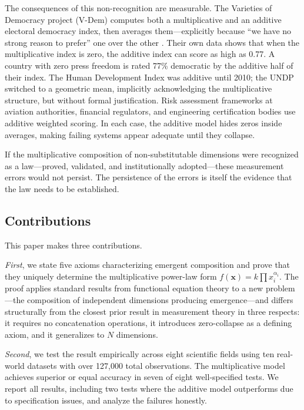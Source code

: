 \documentclass[12pt, a4paper]{article}
\theoremstyle{definition}
\theoremstyle{remark}
\begin{document}
The consequences of this non-recognition are measurable. The Varieties of Democracy project (V-Dem) computes both a multiplicative and an additive electoral democracy index, then averages them---explicitly because ``we have no strong reason to prefer'' one over the other \cite{coppedge2018}. Their own data shows that when the multiplicative index is zero, the additive index can score as high as 0.77. A country with zero press freedom is rated 77\% democratic by the additive half of their index. The Human Development Index was additive until 2010; the UNDP switched to a geometric mean, implicitly acknowledging the multiplicative structure, but without formal justification. Risk assessment frameworks at aviation authorities, financial regulators, and engineering certification bodies use additive weighted scoring. In each case, the additive model hides zeros inside averages, making failing systems appear adequate until they collapse.

If the multiplicative composition of non-substitutable dimensions were recognized as a law---proved, validated, and institutionally adopted---these measurement errors would not persist. The persistence of the errors is itself the evidence that the law needs to be established.

\subsection{Contributions}

This paper makes three contributions.

\textit{First}, we state five axioms characterizing emergent composition and prove that they uniquely determine the multiplicative power-law form $f(\mathbf{x}) = k \prod x_i^{\alpha_i}$. The proof applies standard results from functional equation theory \cite{aczel1966} to a new problem---the composition of independent dimensions producing emergence---and differs structurally from the closest prior result in measurement theory \cite{luce1965} in three respects: it requires no concatenation operations, it introduces zero-collapse as a defining axiom, and it generalizes to $N$ dimensions.

\textit{Second}, we test the result empirically across eight scientific fields using ten real-world datasets with over 127,000 total observations. The multiplicative model achieves superior or equal accuracy in seven of eight well-specified tests. We report all results, including two tests where the additive model outperforms due to specification issues, and analyze the failures honestly.
\end{document}
